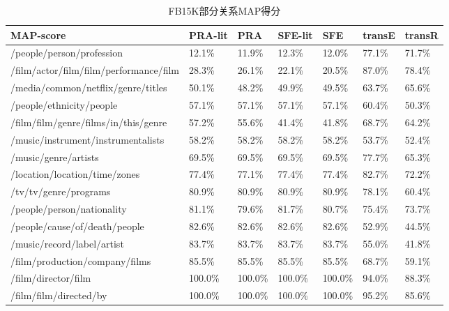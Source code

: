 \begin{table}[htbp]
  \centering
  \caption{FB15K部分关系MAP得分}
    \begin{tabular}{|p{5.8cm}|p{1.4cm}|p{1.4cm}|p{1.4cm}|p{1.4cm}|p{1.4cm}|p{1.4cm}|} %
    \hline
    MAP-score & \multicolumn{1}{l|}{PRA-lit  } & \multicolumn{1}{l|}{PRA} & \multicolumn{1}{l|}{SFE-lit} & \multicolumn{1}{l|}{SFE} & \multicolumn{1}{l|}{transE} & \multicolumn{1}{l|}{transR} \\
    \hline
    /people/person/profession & 12.1\% & 11.9\% & 12.3\% & 12.0\% & 77.1\% & 71.7\% \\
    \hline
    /film/actor/film/film/performance/film & 28.3\% & 26.1\% & 22.1\% & 20.5\% & 87.0\% & 78.4\% \\
    \hline
    /media/common/netflix/genre/titles & 50.1\% & 48.2\% & 49.9\% & 49.5\% & 63.7\% & 65.6\% \\
    \hline
    /people/ethnicity/people & 57.1\% & 57.1\% & 57.1\% & 57.1\% & 60.4\% & 50.3\% \\
    \hline
    /film/film/genre/films/in/this/genre & 57.2\% & 55.6\% & 41.4\% & 41.8\% & 68.7\% & 64.2\% \\
    \hline
    /music/instrument/instrumentalists & 58.2\% & 58.2\% & 58.2\% & 58.2\% & 53.7\% & 52.4\% \\
    \hline
    /music/genre/artists & 69.5\% & 69.5\% & 69.5\% & 69.5\% & 77.7\% & 65.3\% \\
    \hline
    /location/location/time/zones & 77.4\% & 77.1\% & 77.4\% & 77.4\% & 82.7\% & 72.2\% \\
    \hline
    /tv/tv/genre/programs & 80.9\% & 80.9\% & 80.9\% & 80.9\% & 78.1\% & 60.4\% \\
    \hline
    /people/person/nationality & 81.1\% & 79.6\% & 81.7\% & 80.7\% & 75.4\% & 73.7\% \\
    \hline
    /people/cause/of/death/people & 82.6\% & 82.6\% & 82.6\% & 82.6\% & 52.9\% & 44.5\% \\
    \hline
    /music/record/label/artist & 83.7\% & 83.7\% & 83.7\% & 83.7\% & 55.0\% & 41.8\% \\
    \hline
    /film/production/company/films & 85.5\% & 85.5\% & 85.5\% & 85.5\% & 68.7\% & 59.1\% \\
    \hline
    /film/director/film & 100.0\% & 100.0\% & 100.0\% & 100.0\% & 94.0\% & 88.3\% \\
    \hline
    /film/film/directed/by & 100.0\% & 100.0\% & 100.0\% & 100.0\% & 95.2\% & 85.6\% \\
    \hline
    \end{tabular}%
  \label{tab:addlabel-fb-map}%
\end{table}%

